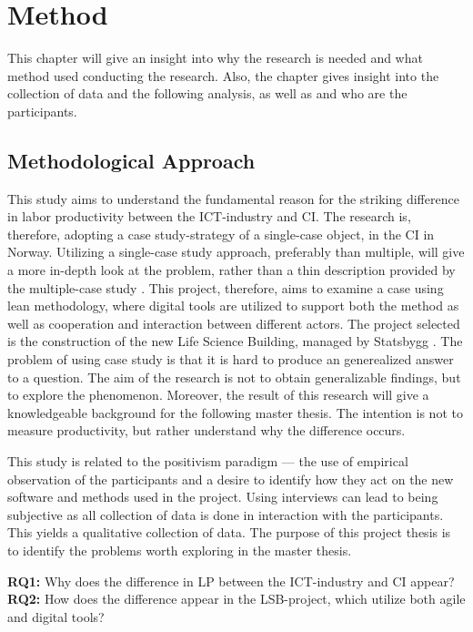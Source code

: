 
\chapter{Method}
This chapter will give an insight into why the research is needed and what method used conducting the research. Also, the chapter gives insight into the collection of data and the following analysis, as well as and who are the participants.

\section{Methodological Approach} \label{sec:purpose}
This study aims to understand the fundamental reason for the striking difference in labor productivity between the ICT-industry and CI. The research is, therefore, adopting a case study-strategy of a single-case object, in the CI in Norway. Utilizing a single-case study approach, preferably than multiple, will give a more in-depth look at the problem, rather than a thin description provided by the multiple-case study \cite{yin1993case}. This project, therefore, aims to examine a case using lean methodology, where digital tools are utilized to support both the method as well as cooperation and interaction between different actors. The project selected is the construction of the new Life Science Building, managed by Statsbygg \cite{statsbygg2019uio}. The problem of using case study is that it is hard to produce an generealized answer to a question. The aim of the research is not to obtain generalizable findings, but to explore the phenomenon. Moreover, the result of this research will give a knowledgeable background for the following master thesis. The intention is not to measure productivity, but rather understand why the difference occurs.

This study is related to the positivism paradigm — the use of empirical observation of the participants and a desire to identify how they act on the new software and methods used in the project. Using interviews can lead to being subjective as all collection of data is done in interaction with the participants. This yields a qualitative collection of data. The purpose of this project thesis is to identify the problems worth exploring in the master thesis.

{\noindent \bf RQ1:} Why does the difference in LP between the ICT-industry and CI appear? \\
{\bf RQ2:} How does the difference appear in the LSB-project, which utilize both agile and digital tools?

